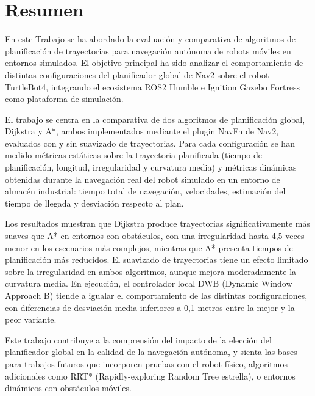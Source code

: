 \chapter*{Resumen}

En este Trabajo se ha abordado la evaluación y comparativa de algoritmos de planificación de trayectorias para navegación autónoma de robots móviles en entornos simulados. El objetivo principal ha sido analizar el comportamiento de distintas configuraciones del planificador global de Nav2 sobre el robot TurtleBot4, integrando el ecosistema ROS2 Humble e Ignition Gazebo Fortress como plataforma de simulación.

El trabajo se centra en la comparativa de dos algoritmos de planificación global, Dijkstra y A*, ambos implementados mediante el plugin NavFn de Nav2, evaluados con y sin suavizado de trayectorias. Para cada configuración se han medido métricas estáticas sobre la trayectoria planificada (tiempo de planificación, longitud, irregularidad y curvatura media) y métricas dinámicas obtenidas durante la navegación real del robot simulado en un entorno de almacén industrial: tiempo total de navegación, velocidades, estimación del tiempo de llegada y desviación respecto al plan.

Los resultados muestran que Dijkstra produce trayectorias significativamente más suaves que A* en entornos con obstáculos, con una irregularidad hasta 4,5 veces menor en los escenarios más complejos, mientras que A* presenta tiempos de planificación más reducidos. El suavizado de trayectorias tiene un efecto limitado sobre la irregularidad en ambos algoritmos, aunque mejora moderadamente la curvatura media. En ejecución, el controlador local DWB (Dynamic Window Approach B) tiende a igualar el comportamiento de las distintas configuraciones, con diferencias de desviación media inferiores a 0,1 metros entre la mejor y la peor variante.

Este trabajo contribuye a la comprensión del impacto de la elección del planificador global en la calidad de la navegación autónoma, y sienta las bases para trabajos futuros que incorporen pruebas con el robot físico, algoritmos adicionales como RRT* (Rapidly-exploring Random Tree estrella), o entornos dinámicos con obstáculos móviles.
